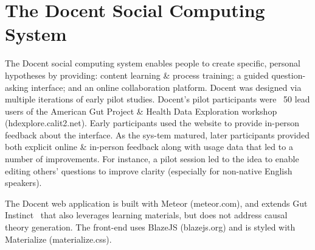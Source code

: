 
\section{The Docent Social Computing System}
The Docent social computing system enables people to create specific, personal hypotheses by providing: content learning \& process training; a guided question-asking interface; and an online collaboration platform. Docent was designed via multiple iterations of early pilot studies. Docent’s pilot participants were ~50 lead users of the American Gut Project \& Health Data Exploration workshop (hdexplore.calit2.net). Early participants used the website to provide in-person feedback about the interface. As the sys-tem matured, later participants provided both explicit online \& in-person feedback along with usage data that led to a number of improvements. For instance, a pilot session led to the idea to enable editing others’ questions to improve clarity (especially for non-native English speakers).

The Docent web application is built with Meteor (meteor.com), and extends Gut Instinct~\cite{Pandey2017} that also leverages learning materials, but does not address causal theory generation. The front-end uses BlazeJS (blazejs.org) and is styled with Materialize (materialize.css).

